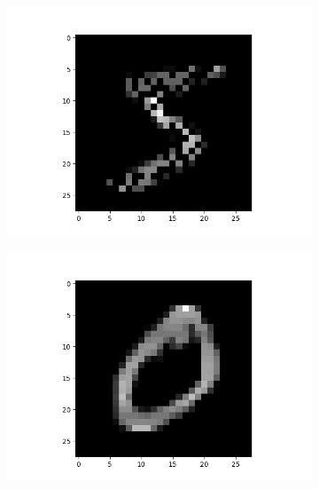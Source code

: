\documentclass[12pt,a4paper]{article}
\begin{document}
\begin{enumerate}[a)]
\begin{enumerate}[i.]
\begin{figure}[H]
\begin{subfigure}{0.5\textwidth}
                                \end{subfigure}
                                \begin{subfigure}{0.5\textwidth}
                                    \raggedleft
                                    \includegraphics[width=\textwidth]{images/im0.png}
                                \end{subfigure}
                            \end{figure}
                            \begin{figure}[H]
                                \begin{subfigure}{0.5\textwidth}
                                    \raggedleft
                                    \includegraphics[width=\textwidth]{images/im3.png}

\end{subfigure}
\end{figure}
\end{enumerate}
\end{enumerate}
\end{document}
